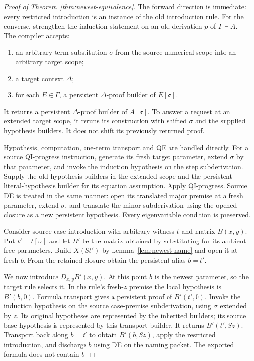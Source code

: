 \begin{proof}[Proof of Theorem~\ref{thm:newest-equivalence}]
The forward direction is immediate: every restricted introduction is an
instance of the old introduction rule. For the converse, strengthen the
induction statement on an old derivation $p$ of $\Gamma\vdash A$.
The compiler accepts:

\begin{enumerate}
 \item an arbitrary term substitution $\sigma$ from the source numerical
       scope into an arbitrary target scope;
 \item a target context $\Delta$;
 \item for each $E\in\Gamma$, a persistent $\Delta$-proof builder of
       $E[\sigma]$.
\end{enumerate}

It returns a persistent $\Delta$-proof builder of $A[\sigma]$.
To answer a request at an extended target scope, it reruns its construction
with shifted $\sigma$ and the supplied hypothesis builders. It does not
shift its previously returned proof.

Hypothesis, computation, one-term transport and QE are handled directly.
For a source QI-progress instruction, generate its fresh target parameter,
extend $\sigma$ by that parameter, and invoke the induction hypothesis
on the step subderivation. Supply the old hypothesis builders in the
extended scope and the persistent literal-hypothesis builder for its
equation assumption. Apply QI-progress. Source DE is treated in the
same manner: open its translated major premise at a fresh parameter,
extend $\sigma$, and translate the minor subderivation using the opened
closure as a new persistent hypothesis. Every eigenvariable condition
is preserved.

Consider source case introduction with arbitrary witness $t$ and matrix
$B(x,y)$. Put $t'=t[\sigma]$ and let $B'$ be the matrix obtained by
substituting for its ambient free parameters. Build $X(St')$ by
Lemma~\ref{lem:newest-name} and open it at fresh $b$. From the retained
closure obtain the persistent alias $b=t'$.

We now introduce $D_{x,y}B'(x,y)$. At this point $b$ is the newest
parameter, so the target rule selects it. In the rule's fresh-$z$
premise the local hypothesis is $B'(b,0)$. Formula transport gives
a persistent proof of $B'(t',0)$. Invoke the induction hypothesis on
the source case-premise subderivation, using $\sigma$ extended by $z$.
Its original hypotheses are represented by the inherited builders;
its source base hypothesis is represented by this transport builder.
It returns $B'(t',Sz)$. Transport back along $b=t'$ to obtain
$B'(b,Sz)$, apply the restricted introduction, and discharge $b$ using
DE on the naming packet. The exported formula does not contain $b$.


\end{proof}
